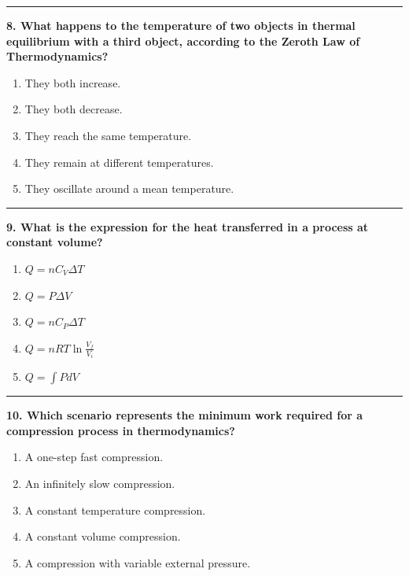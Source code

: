 \documentclass[
  9pt,
]{extbook}
\providecommand{\tightlist}{%
  \setlength{\itemsep}{0pt}\setlength{\parskip}{0pt}}
\theoremstyle{definition}
\theoremstyle{definition}
\theoremstyle{definition}
\theoremstyle{definition}
\theoremstyle{remark}
\begin{document}
\begin{center}\rule{0.5\linewidth}{0.5pt}\end{center}

\textbf{8. What happens to the temperature of two objects in thermal equilibrium with a third object, according to the Zeroth Law of Thermodynamics?}

\begin{enumerate}
\def\labelenumi{\alph{enumi}.}
\tightlist
\item
  They both increase.
\item
  They both decrease.
\item
  They reach the same temperature.
\item
  They remain at different temperatures.
\item
  They oscillate around a mean temperature.
\end{enumerate}

\begin{center}\rule{0.5\linewidth}{0.5pt}\end{center}

\textbf{9. What is the expression for the heat transferred in a process at constant volume?}

\begin{enumerate}
\def\labelenumi{\alph{enumi}.}
\tightlist
\item
  \(Q = nC_V \Delta T\)
\item
  \(Q = P \Delta V\)
\item
  \(Q = n C_P \Delta T\)
\item
  \(Q = nRT \ln \frac{V_f}{V_i}\)
\item
  \(Q = \int PdV\)
\end{enumerate}

\begin{center}\rule{0.5\linewidth}{0.5pt}\end{center}

\textbf{10. Which scenario represents the minimum work required for a compression process in thermodynamics?}

\begin{enumerate}
\def\labelenumi{\alph{enumi}.}
\tightlist
\item
  A one-step fast compression.
\item
  An infinitely slow compression.
\item
  A constant temperature compression.
\item
  A constant volume compression.
\item
  A compression with variable external pressure.
\end{enumerate}
\end{document}
